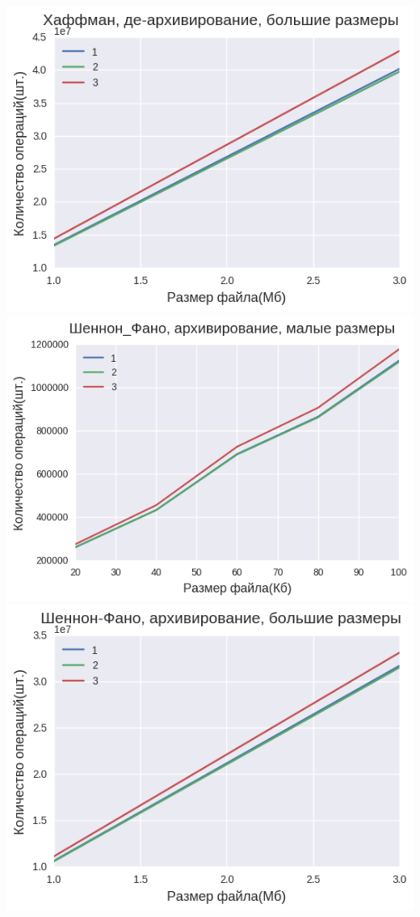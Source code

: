 \documentclass[russian, a4paper, 12pt]{article}
\begin{document}
\begin{center}
\includegraphics[width=0.9\linewidth]{./plots/1/1_1_2_2.png}\\
\includegraphics[width=0.9\linewidth]{./plots/1/1_2_1_1.png}\\
\includegraphics[width=0.9\linewidth]{./plots/1/1_2_1_2.png}\\

\end{center}
\end{document}
